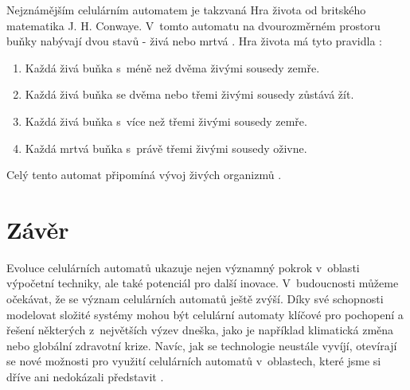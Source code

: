 \documentclass[11pt]{article}
\begin{document}
    Nejznámějším celulárním automatem je takzvaná Hra života od britského matematika J. H. Conwaye. V~tomto automatu na dvourozměrném prostoru buňky nabývají dvou stavů - živá nebo mrtvá \cite{online_gol}. Hra života má tyto pravidla \cite{pravidla}:
    \begin{enumerate}
        \item Každá živá buňka s~méně než dvěma živými sousedy zemře.
        \item Každá živá buňka se dvěma nebo třemi živými sousedy zůstává žít.
        \item Každá živá buňka s~více než třemi živými sousedy zemře.
        \item Každá mrtvá buňka s~právě třemi živými sousedy oživne.
    \end{enumerate}
    Celý tento automat připomíná vývoj živých organizmů \cite{article_scientific_american}.

\section*{Závěr}
    Evoluce celulárních automatů ukazuje nejen významný pokrok v~oblasti výpočetní techniky, ale také potenciál pro další inovace. V~budoucnosti můžeme očekávat, že se význam celulárních automatů ještě zvýší. Díky své schopnosti modelovat složité systémy mohou být celulární automaty klíčové pro pochopení a řešení některých z~největších výzev dneška, jako je například klimatická změna nebo globální zdravotní krize. Navíc, jak se technologie neustále vyvíjí, otevírají se nové možnosti pro využití celulárních automatů v~oblastech, které jsme si dříve ani nedokázali představit \cite{bakalarka}.

\newpage


\renewcommand{\refname}{Literatura}

\end{document}

